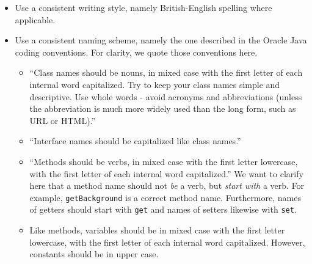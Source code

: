 \begin{itemize}
	\item Use a consistent writing style, namely British-English spelling where applicable.
	\item Use a consistent naming scheme, namely the one described in the Oracle Java coding conventions. For clarity, we quote those conventions here.
		\begin{itemize}
			\item ``Class names should be nouns, in mixed case with the first letter of each internal word capitalized. Try to keep your class names simple and descriptive. Use whole words - avoid acronyms and abbreviations (unless the abbreviation is much more widely used than the long form, such as URL or HTML).''
			\item ``Interface names should be capitalized like class names.''
			\item ``Methods should be verbs, in mixed case with the first letter lowercase, with the first letter of each internal word capitalized.'' We want to clarify here that a method name should not \emph{be} a verb, but \emph{start with} a verb. For example, \texttt{getBackground} is a correct method name. Furthermore, names of getters should start with \texttt{get} and names of setters likewise with \texttt{set}.
			\item Like methods, variables should be in mixed case with the first letter lowercase, with the first letter of each internal word capitalized. However, constants should be in upper case.
			

\end{itemize}
\end{itemize}
